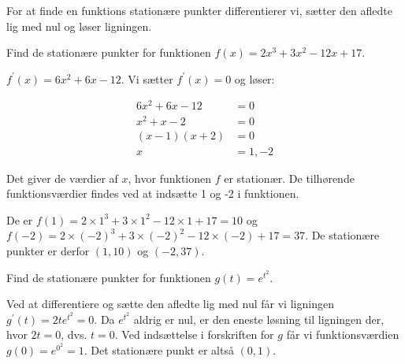 For at finde en funktions stationære punkter differentierer vi, sætter den afledte lig med nul og løser ligningen.

\begin{example}

    Find de stationære punkter for funktionen $f(x)=2 x^{3}+3 x^{2}-12 x+17$.
    \label{ex:stationary-points-1}
\end{example}


\begin{solution}
    
    $f^{\prime}(x)=6 x^{2}+6 x-12$. Vi sætter $f^{\prime}(x)=0$ og løser:


\[
\begin{aligned}
6 x^{2}+6 x-12 & =0 \\
x^{2}+x-2 & =0 \\
(x-1)(x+2) & =0 \\
x & =1,-2
\end{aligned}
\]

Det giver de værdier af $x$, hvor funktionen $f$ er stationær. De tilhørende funktionsværdier findes ved at indsætte 1 og -2 i funktionen.

De er $f(1)=2 \times 1^{3}+3 \times 1^{2}-12 \times 1+17=10$ og 
$f(-2)=2 \times(-2)^{3}+3 \times(-2)^{2}-12 \times(-2)+17=37$. De stationære punkter er derfor $(1,10)$ og $(-2,37)$.
\end{solution}


\begin{example}

    Find de stationære punkter for funktionen $g(t)=e^{t^{2}}$.
\end{example}

\begin{solution}
    Ved at differentiere og sætte den afledte lig med nul får vi ligningen $g^{\prime}(t)=2 t e^{t^{2}}=0$. Da $e^{t^{2}}$ aldrig er nul, er den eneste løsning til ligningen der, hvor $2 t=0$, dvs. $t=0$. Ved indsættelse i forskriften for $g$ får vi funktionsværdien $g(0)=e^{0^{2}}=1$. Det stationære punkt er altså $(0,1)$.
\end{solution}

